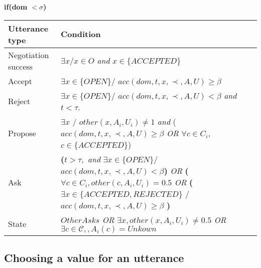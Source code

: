 \documentclass{article}
\begin{document}
	\textbf{if(\textbf{dom  $<\sigma$})} \\
	\begin{tabular}{|p{3cm}|p{9cm}|}
		\hline
		\textbf{Utterance type} & Condition \\
		\hline
		Negotiation success &  $\exists x/ x \in O$ \emph{and} $x \in \{ACCEPTED\}$ \\
		\hline
		Accept & $\exists x \in \{OPEN\} /$ \newline $acc(dom,t,x,\prec,A,U) \geq \beta$ \\
		\hline
		Reject & $\exists x \in \{OPEN\} /$ \newline $ acc(dom,t,x,\prec,A,U) < \beta$  \emph{and} $t<\tau$.\\
		\hline
		Propose & $\exists x$ / $other(x, A_i, U_i) \not = 1 $  \emph{and}
		\newline ($acc(dom,t,x,\prec,A,U) \geq \beta$
		\newline \emph{OR}  
		\newline $\forall c \in C_i$,  $c \in \{ACCEPTED\}$)\\
		\hline
		Ask &  \textbf{(}$t> \tau,$ \emph{and} 
		\newline $\exists x \in \{OPEN\} /$
		\newline $ acc(dom,t,x,\prec,A,U) < \beta $\textbf{) }
		\newline \emph{OR}
		\newline \textbf{(}$ \forall c \in C_i,other(c, A_i, U_i)=0.5$
		\newline \emph{OR} 
		\newline \textbf{(}$\exists x \in \{ACCEPTED, REJECTED\}$ / 
		\newline $acc(dom,t,x,\prec,A,U) \geq \beta$ \textbf{)} \\
		\hline
		
		State & $OtherAsks$
		\newline \emph{OR}
		\newline $\exists x,other(x, A_i, U_i) \not = 0.5 $ 
		\newline \emph{OR}
		\newline $ \exists c \in \mathcal{C}, , A_i(c) = Unkown$
		\\
		\hline
	\end{tabular}
	

	\subsection{Choosing a value for an utterance}
	
\end{document}
